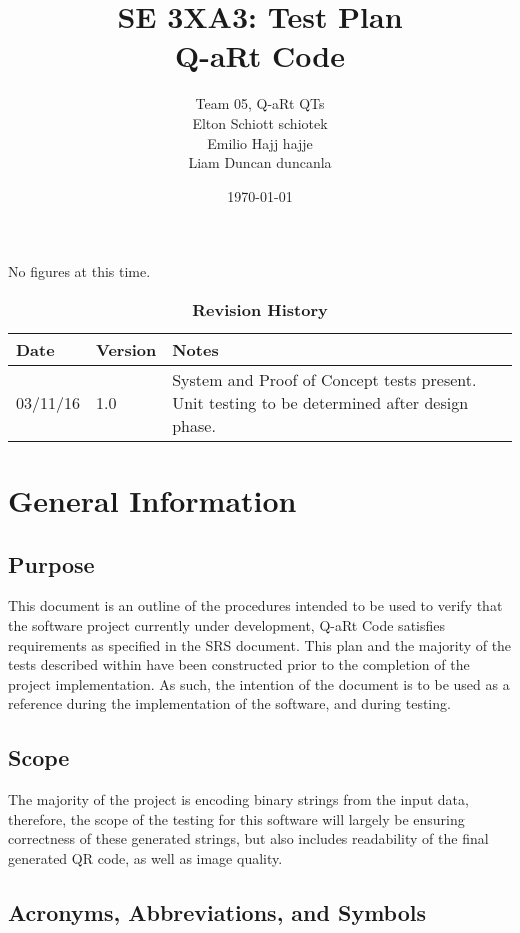 \documentclass[12pt, titlepage]{article}
\title{SE 3XA3: Test Plan\\Q-aRt Code}
\author{Team 05, Q-aRt QTs
		\\ Elton Schiott schiotek
		\\ Emilio Hajj hajje
		\\ Liam Duncan duncanla
}
\date{\today}
\begin{document}
\maketitle

\tableofcontents
\listoftables
\listoffigures

No figures at this time.

\begin{table}[bp]
\caption{\bf Revision History}
\begin{tabularx}{\textwidth}{p{3cm}p{2cm}X}
\toprule {\bf Date} & {\bf Version} & {\bf Notes}\\
\midrule
03/11/16 & 1.0 & System and Proof of Concept tests present. Unit testing to be determined after design phase.\\
\bottomrule
\end{tabularx}
\end{table}

\newpage


\section{General Information}

\subsection{Purpose}
	This document is an outline of the procedures intended to be used to verify 
	that the software project currently under development, Q-aRt Code satisfies 
	requirements as specified in the SRS document. This plan and the majority 
	of the tests described within have been constructed prior to the completion 
	of the project implementation. As such, the intention of the document is to 
	be used as a reference during the implementation of the software, and 
	during testing.
\subsection{Scope}
	The majority of the project is encoding binary strings from the input data, 
	therefore, the scope of the testing for this software will largely be 
	ensuring correctness of these generated strings, but also includes 
	readability of the final generated QR code, as well as image quality.
\subsection{Acronyms, Abbreviations, and Symbols}
	
\end{document}
